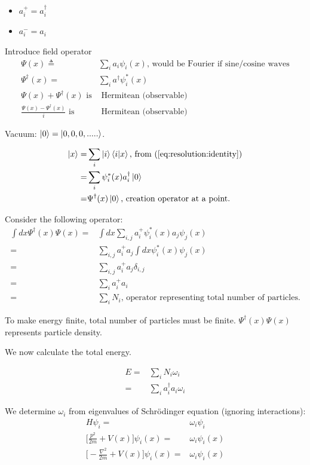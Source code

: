 \documentclass[]{article}
\begin{document}
\begin{itemize}
	\item $a^+_i=a^\dagger_i$
	\item $a^-_i=a_i$
\end{itemize} 

Introduce field operator
\begin{align*}
\Psi(x) \triangleq & \sum_{i} a_i \psi_i(x) \text{, would be Fourier if sine/cosine waves}\\
\Psi^\dagger(x) =& \sum_{i} a^\dagger \psi^*_i(x)\\
\Psi(x) + \Psi^\dagger(x) \text{ is}& \text{ Hermitean (observable)}\\
\frac{\Psi(x) - \Psi^\dagger(x)}{i} \text{ is}& \text{ Hermitean (observable)}
\end{align*}

Vacuum: $\ket{0} = \ket{0,0,0,.....}$.

\begin{align*}
\ket{x}=&\sum_{i}\ket{i}\braket{i|x}\text{, from (\ref{eq:resolution:identity})}\\
=& \sum_i \psi^*_i(x)a^\dagger_i\ket{0}\\
=& \Psi^\dagger(x) \ket{0}\text{, creation operator at a point.}
\end{align*} 

Consider the following operator:
\begin{align*}
\int dx \Psi^\dagger(x) \Psi(x)=&\int dx \sum_{i,j}a^+_i\psi_i^*(x) a_j\psi_j(x)\\
=&\sum_{i,j} a^+_i a_j \int dx \psi_i^*(x) \psi_j(x)\\
=&\sum_{i,j} a^+_i a_j \delta_{i,j}\\
=&\sum_i a^+_i a_i\\
=&\sum_i N_i\text{, operator representing total number of particles.}
\end{align*}

To make energy finite, total number of particles must be finite. $\Psi^\dagger(x) \Psi(x)$ represents particle density.

We now calculate the total energy.

\begin{align*}
E =& \sum_{i} N_i \omega_i\\
=& \sum_{i} a^\dagger_i a_i \omega_i
\end{align*}

We determine $\omega_i$ from eigenvalues of Schr\"odinger equation (ignoring interactions):
\begin{align*}
H \psi_i =& \omega_i \psi_i\\
\big[\frac{p^2}{2m} + V(x)\big]\psi_i(x)=& \omega_i \psi_i(x)\\
\big[-\frac{\nabla^2}{2m} + V(x)\big]\psi_i(x)=& \omega_i \psi_i(x)
\end{align*}
\end{document}
